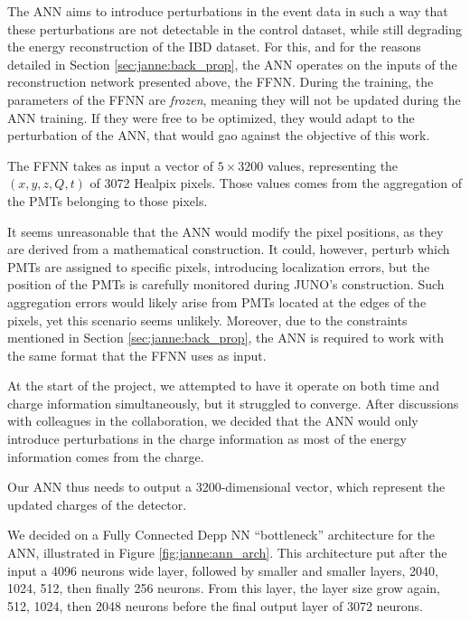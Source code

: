 \documentclass[../main.tex]{subfiles}
\begin{document}
The ANN aims to introduce perturbations in the event data in such a way that these perturbations are not detectable in the control dataset, while still degrading the energy reconstruction of the IBD dataset. For this, and for the reasons detailed in Section \ref{sec:janne:back_prop}, the ANN operates on the inputs of the reconstruction network presented above, the FFNN. During the training, the parameters of the FFNN are \textit{frozen}, meaning they will not be updated during the ANN training. If they were free to be optimized, they would adapt to the perturbation of the ANN, that would gao against the objective of this work.

The FFNN takes as input a vector of $5 \times 3200$ values, representing the $(x, y, z, Q, t)$ of 3072 Healpix pixels. Those values comes from the aggregation of the PMTs belonging to those pixels.

It seems unreasonable that the ANN would modify the pixel positions, as they are derived from a mathematical construction. It could, however, perturb which PMTs are assigned to specific pixels, introducing localization errors, but the position of the PMTs is carefully monitored during JUNO’s construction. Such aggregation errors would likely arise from PMTs located at the edges of the pixels, yet this scenario seems unlikely. Moreover, due to the constraints mentioned in Section \ref{sec:janne:back_prop}, the ANN is required to work with the same format that the FFNN uses as input.

At the start of the project, we attempted to have it operate on both time and charge information simultaneously, but it struggled to converge. After discussions with colleagues in the collaboration, we decided that the ANN would only introduce perturbations in the charge information as most of the energy information comes from the charge.

Our ANN thus needs to output a 3200-dimensional vector, which represent the updated charges of the detector.

We decided on a Fully Connected Depp NN ``bottleneck'' architecture for the ANN, illustrated in Figure \ref{fig:janne:ann_arch}. This architecture put after the input a 4096 neurons wide layer, followed by smaller and smaller layers, 2040, 1024, 512, then finally 256 neurons. From this layer, the layer size grow again, 512, 1024, then 2048 neurons before the final output layer of 3072 neurons.
\end{document}

